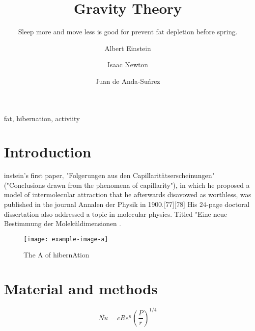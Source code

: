 \documentclass{SFEE_journal/SFEE}
\begin{document}
\twocolumn

\title{Gravity Theory}
\subtitle{Sleep more and move less is good for prevent fat depletion before   spring.}
\author[1,*]{Albert Einstein }
\author[2]{Isaac Newton}
\author[3]{Juan de Anda-Suárez }
\maketitle
\begin{abstract}
    \lipsum[5]
\end{abstract}
\begin{keywords}
    fat, hibernation, activiity
\end{keywords}

\section{Introduction}

instein's first paper, "Folgerungen aus den Capillaritätserscheinungen" ("Conclusions drawn from the phenomena of capillarity"), in which he proposed a model of intermolecular attraction that he afterwards disavowed as worthless, was published in the journal Annalen der Physik in 1900.[77][78] His 24-page doctoral dissertation also addressed a topic in molecular physics. Titled "Eine neue Bestimmung der Moleküldimensionen \cite{andacalzadaortiz2022}.

\begin{figure}[b!]
\texttt{[image: example-image-a]}
\caption{The A of hibernAtion}
\end{figure}
\lipsum[10-13]
\section{Material and methods}
\lipsum[14-17]
\begin{equation}
 \bar{Nu}=cRe^{n}\left ( \frac{P}{r} \right )^{1/4}
\end{equation}
\end{document}
